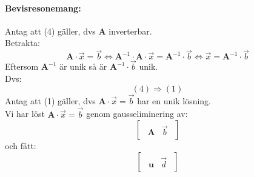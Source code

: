 \paragraph{Bevisresonemang:} %
\label{par:bevisresonemang}
Antag att (4) gäller, dvs \textbf{A} inverterbar.\\
Betrakta:
\[
    \mathbf{A} \cdot \vec{x} = \vec{b} \Leftrightarrow \mathbf{A}^{-1} \cdot \mathbf{A} \cdot \vec{x} = \mathbf{A}^{-1} \cdot \vec{b} \Leftrightarrow \vec{x} = \mathbf{A}^{-1} \cdot \vec{b}
\]
Eftersom $\mathbf{A}^{-1}$ är unik så är $\mathbf{A}^{-1} \cdot \vec{b}$ unik.\\
Dvs:
\[
    (4) \Rightarrow (1)
\]
Antag att (1) gäller, dvs $\mathbf{A} \cdot \vec{x} = \vec{b}$ har en unik lösning.\\
Vi har löst $\mathbf{A} \cdot \vec{x} = \vec{b}$ genom gausseliminering av:
\[
    \begin{bmatrix} 
    \begin{array}{c|c}
    	\mathbf{A} & \vec{b}
    \end{array}
    \end{bmatrix}
\]
och fått:
\[
    \begin{bmatrix} 
    \begin{array}{c|c}
    	\mathbf{u} & \vec{d}
    \end{array}
    \end{bmatrix}
\]
